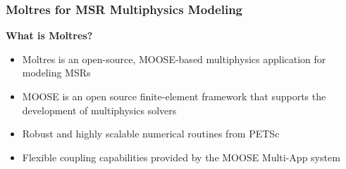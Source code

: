 \begin{frame}
  \frametitle{Moltres for MSR Multiphysics Modeling}
  \textbf{What is Moltres?}
  \begin{itemize}
    \item Moltres \cite{lindsay_introduction_2018} is an open-source, MOOSE-based
      multiphysics application for modeling MSRs
	\item \gls{MOOSE} \cite{lindsay_20_2022} is an open source finite-element framework
      that supports the development of multiphysics solvers
    \item Robust and highly scalable numerical routines from PETSc
    \item Flexible coupling capabilities provided by the MOOSE Multi-App system
  \end{itemize}
\end{frame}

